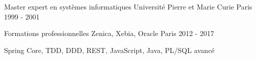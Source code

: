 

\begin{cventries}

  \cventry
    {Master expert en systèmes informatiques} %
    {Université Pierre et Marie Curie} %
    {Paris} %
    {1999 - 2001} %
    {
    }

  \cventry    
    {Formations professionnelles} %
    {Zenica, Xebia, Oracle} %
    {Paris} %
    {2012 - 2017} %
    {
      \begin{cvitems}
        Spring Core, TDD, DDD, REST, JavaScript, Java, PL/SQL avancé
      \end{cvitems}
    }

\end{cventries}
